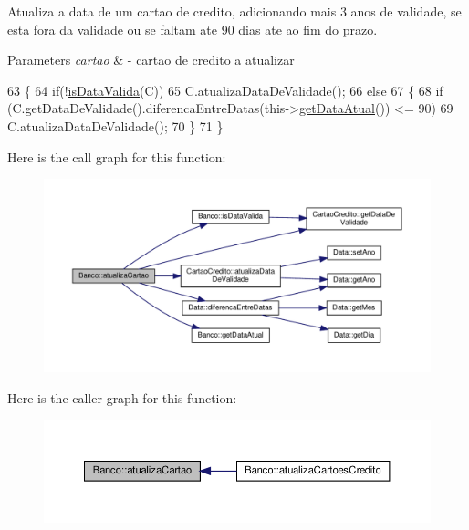 Atualiza a data de um cartao de credito, adicionando mais 3 anos de validade, se esta fora da validade ou se faltam ate 90 dias ate ao fim do prazo. 


\begin{DoxyParams}{Parameters}
{\em cartao} & -\/ cartao de credito a atualizar \\
\hline
\end{DoxyParams}

\begin{DoxyCode}
63 \{
64     \textcolor{keywordflow}{if}(!\hyperlink{classBanco_ac469cc9db5980081701bf9eb27a7e612}{isDataValida}(C))
65         C.atualizaDataDeValidade();
66     \textcolor{keywordflow}{else}
67     \{
68         \textcolor{keywordflow}{if} (C.getDataDeValidade().diferencaEntreDatas(this->\hyperlink{classBanco_a0735f07636c578666068a16f6ecccd91}{getDataAtual}()) <= 90)
69             C.atualizaDataDeValidade();
70     \}
71 \}
\end{DoxyCode}
Here is the call graph for this function\+:
\nopagebreak
\begin{figure}[H]
\begin{center}
\leavevmode
\includegraphics[width=350pt]{classBanco_a8c8f743903ba86129b62afbb3813e6f0_cgraph}
\end{center}
\end{figure}
Here is the caller graph for this function\+:
\nopagebreak
\begin{figure}[H]
\begin{center}
\leavevmode
\includegraphics[width=350pt]{classBanco_a8c8f743903ba86129b62afbb3813e6f0_icgraph}
\end{center}
\end{figure}
\mbox{\label{classBanco_ad6f39d091c83361878bc5cfda534a49d}} 

